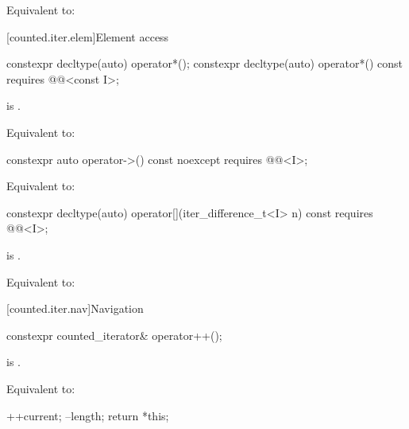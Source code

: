 \begin{itemdescr}
\pnum
\effects
Equivalent to: 
\end{itemdescr}

[counted.iter.elem]{Element access}

%
\begin{itemdecl}
constexpr decltype(auto) operator*();
constexpr decltype(auto) operator*() const
  requires @@<const I>;
\end{itemdecl}

\begin{itemdescr}
\pnum
\hardexpects
{} is .

\pnum
\effects
Equivalent to: 
\end{itemdescr}

%
\begin{itemdecl}
constexpr auto operator->() const noexcept
  requires @@<I>;
\end{itemdecl}

\begin{itemdescr}
\pnum
\effects
Equivalent to: 
\end{itemdescr}

%
\begin{itemdecl}
constexpr decltype(auto) operator[](iter_difference_t<I> n) const
  requires @@<I>;
\end{itemdecl}

\begin{itemdescr}
\pnum
\hardexpects
{} is .

\pnum
\effects
Equivalent to: 
\end{itemdescr}

[counted.iter.nav]{Navigation}

%
\begin{itemdecl}
constexpr counted_iterator& operator++();
\end{itemdecl}

\begin{itemdescr}
\pnum
\hardexpects
{} is .

\pnum
\effects
Equivalent to:
\begin{codeblock}
++current;
--length;
return *this;
\end{codeblock}
\end{itemdescr}

